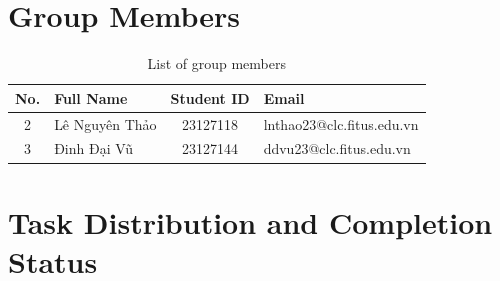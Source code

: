 \newpage
\section*{Group Members}

\begin{table}[H]
\centering
\renewcommand{\arraystretch}{1.5}
    \begin{tabularx}{\textwidth}{|c|X|c|X|}
    \hline
    \textbf{No.} & \textbf{Full Name} & \textbf{Student ID} & \textbf{Email} \\ \hline
    2 & Lê Nguyên Thảo & 23127118 & lnthao23@clc.fitus.edu.vn \\ \hline
    3 & Đinh Đại Vũ & 23127144 & ddvu23@clc.fitus.edu.vn \\ \hline
    \end{tabularx}
\caption{List of group members}
\label{tab:thongtin}
\end{table}

\vspace{1cm}
\renewcommand{\arraystretch}{1.5}
\section*{Task Distribution and Completion Status}

\begin{table}[H]
    \centering
    \caption{Task distribution and completion status}
    \label{tab:phancong}
\end{table}



